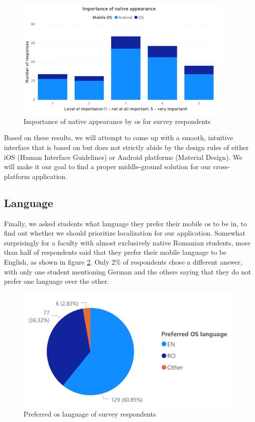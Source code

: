\begin{figure}[ht]
    \centering
         \includegraphics[width=0.95\textwidth]{figures/charts/survey/native_appearance.pdf}
    \caption{Importance of native appearance by \acrshort{os} for survey respondents}
    \label{3:fig:native_appearance}
\end{figure}

Based on these results, we will attempt to come up with a smooth, intuitive interface that is based on but does not strictly abide by the design rules of either iOS (Human Interface Guidelines\cite{apple2020human}) or Android platforms (Material Design\cite{google2020material}). We will make it our goal to find a proper middle-ground solution for our cross-platform application.

\subsection{Language} \label{3:language}

Finally, we asked students what language they prefer their mobile \acrshort{os} to be in, to find out whether we should prioritize localization for our application. Somewhat surprisingly for a faculty with almost exclusively native Romanian students, more than half of respondents said that they prefer their mobile language to be English, as shown in figure \ref{3:fig:language}. Only 2\% of respondents chose a different answer, with only one student mentioning German and the others saying that they do not prefer one language over the other.

\begin{figure}[ht]
    \centering
         \includegraphics[height=0.2\textheight]{figures/charts/survey/language.pdf}
    \caption{Preferred \acrshort{os} language of survey respondents}
    \label{3:fig:language}
\end{figure}

